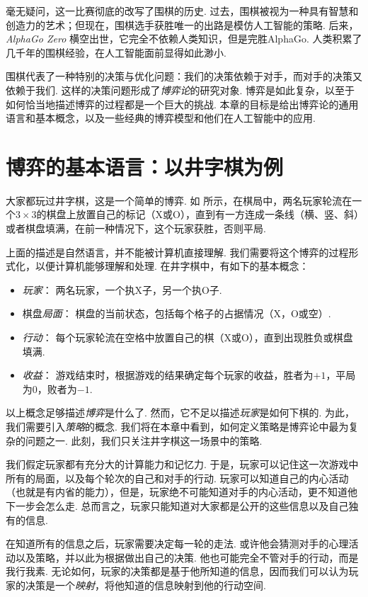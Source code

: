 毫无疑问，这一比赛彻底的改写了围棋的历史. 过去，围棋被视为一种具有智慧和创造力的艺术；但现在，围棋选手获胜唯一的出路是模仿人工智能的策略. 后来，\emph{AlphaGo Zero} 横空出世，它完全不依赖人类知识，但是完胜AlphaGo. 人类积累了几千年的围棋经验，在人工智能面前显得如此渺小. 

围棋代表了一种特别的决策与优化问题：我们的决策依赖于对手，而对手的决策又依赖于我们. 这样的决策问题形成了\emph{博弈论}的研究对象. 博弈是如此复杂，以至于如何恰当地描述博弈的过程都是一个巨大的挑战. 本章的目标是给出博弈论的通用语言和基本概念，以及一些经典的博弈模型和他们在人工智能中的应用.

\section{博弈的基本语言：以井字棋为例}\label{sec:game-basic}

大家都玩过井字棋，这是一个简单的博弈. 如 所示，在棋局中，两名玩家轮流在一个$3\times 3$的棋盘上放置自己的标记（X或O），直到有一方连成一条线（横、竖、斜）或者棋盘填满，在前一种情况下，这个玩家获胜，否则平局. 

上面的描述是自然语言，并不能被计算机直接理解. 我们需要将这个博弈的过程形式化，以便计算机能够理解和处理. 在井字棋中，有如下的基本概念：
\begin{itemize}
    \item \emph{玩家}： 两名玩家，一个执X子，另一个执O子.
    \item 棋盘\emph{局面}： 棋盘的当前状态，包括每个格子的占据情况（X，O或空）.
    \item \emph{行动}： 每个玩家轮流在空格中放置自己的棋（X或O），直到出现胜负或棋盘填满.
    \item \emph{收益}： 游戏结束时，根据游戏的结果确定每个玩家的收益，胜者为$+1$，平局为$0$，败者为$-1$.
\end{itemize}

以上概念足够描述\emph{博弈}是什么了. 然而，它不足以描述\emph{玩家}是如何下棋的. 为此，我们需要引入\emph{策略}的概念. 我们将在本章中看到，如何定义策略是博弈论中最为复杂的问题之一. 此刻，我们只关注井字棋这一场景中的策略.

我们假定玩家都有充分大的计算能力和记忆力. 于是，玩家可以记住这一次游戏中所有的局面，以及每个轮次的自己和对手的行动. 玩家可以知道自己的内心活动（也就是有内省的能力），但是，玩家绝不可能知道对手的内心活动，更不知道他下一步会怎么走. 总而言之，玩家只能知道对大家都是公开的这些信息以及自己独有的信息. 

在知道所有的信息之后，玩家需要决定每一轮的走法. 或许他会猜测对手的心理活动以及策略，并以此为根据做出自己的决策. 他也可能完全不管对手的行动，而是我行我素. 无论如何，玩家的决策都是基于他所知道的信息，因而我们可以认为玩家的决策是一个\emph{映射}，将他知道的信息映射到他的行动空间. 

